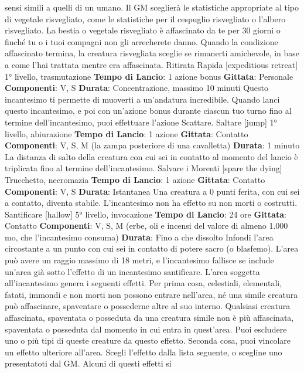 \begin{multicols}{2}
sensi simili a quelli di un umano. Il GM sceglierà le
statistiche appropriate al tipo di vegetale risvegliato,
come le statistiche per il cespuglio risvegliato o l’albero
risvegliato.
La bestia o vegetale risvegliato è affascinato da te per
30 giorni o finché tu o i tuoi compagni non gli
arrecherete danno. Quando la condizione affascinato
termina, la creatura risvegliata sceglie se rimanerti
amichevole, in base a come l’hai trattata mentre era
affascinata.
Ritirata Rapida
[expeditious retreat]
1° livello, trasmutazione
\textbf{Tempo di Lancio}: 1 azione bonus
\textbf{Gittata}: Personale
\textbf{Componenti}: V, S
\textbf{Durata}: Concentrazione, massimo 10 minuti
Questo incantesimo ti permette di muoverti a
un’andatura incredibile. Quando lanci questo
incantesimo, e poi con un’azione bonus durante
ciascun tuo turno fino al termine dell’incantesimo, puoi
effettuare l’azione Scattare.
Saltare
[jump]
1° livello, abiurazione
\textbf{Tempo di Lancio}: 1 azione
\textbf{Gittata}: Contatto
\textbf{Componenti}: V, S, M (la zampa posteriore di una
cavalletta)
\textbf{Durata}: 1 minuto
La distanza di salto della creatura con cui sei in contatto
al momento del lancio è triplicata fino al termine
dell’incantesimo.
Salvare i Morenti
[spare the dying]
Trucchetto, necromazia
\textbf{Tempo di Lancio}: 1 azione
\textbf{Gittata}: Contatto
\textbf{Componenti}: V, S
\textbf{Durata}: Istantanea
Una creatura a 0 punti ferita, con cui sei a contatto,
diventa stabile. L’incantesimo non ha effetto su non
morti o costrutti.
Santificare
[hallow]
5° livello, invocazione
\textbf{Tempo di Lancio}: 24 ore
\textbf{Gittata}: Contatto
\textbf{Componenti}: V, S, M (erbe, oli e incensi del valore di
almeno 1.000 mo, che l’incantesimo consuma)
\textbf{Durata}: Fino a che dissolto
Infondi l’area circostante a un punto con cui sei in
contatto di potere sacro (o blasfemo). L’area può avere
un raggio massimo di 18 metri, e l’incantesimo fallisce
se include un’area già sotto l’effetto di un incantesimo
santificare. L’area soggetta all’incantesimo genera i
seguenti effetti.
Per prima cosa, celestiali, elementali, fatati, immondi e
non morti non possono entrare nell’area, né una simile
creatura può affascinare, spaventare o possederne
altre al suo interno. Qualsiasi creatura affascinata,
spaventata o posseduta da una creatura simile non è
più affascinata, spaventata o posseduta dal momento in
cui entra in quest’area. Puoi escludere uno o più tipi di
queste creature da questo effetto.
Seconda cosa, puoi vincolare un effetto ulteriore
all’area. Scegli l’effetto dalla lista seguente, o scegline
uno presentatoti dal GM. Alcuni di questi effetti si

\end{multicols}
